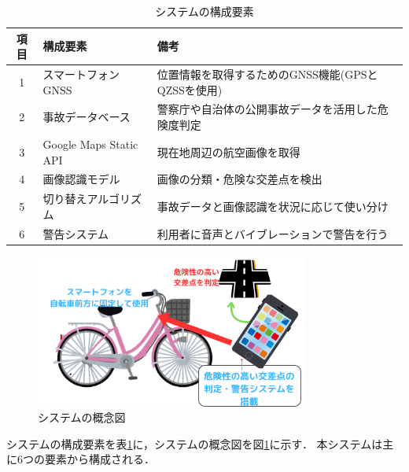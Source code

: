 \documentclass[uplatex,dvipdfmx]{jsarticle}
\begin{document}
\begin{table}[H]
  \centering
  \caption{システムの構成要素}
  \label{tab:system_components}
  \begin{tabular}{|c|l|l|}
    \hline
    項目 & 構成要素 & 備考\\ \hline
    1 & スマートフォンGNSS & 位置情報を取得するためのGNSS機能(GPSとQZSSを使用) \\ \hline
    2 & 事故データベース & 警察庁や自治体の公開事故データを活用した危険度判定 \\ \hline
    3 & Google Maps Static API & 現在地周辺の航空画像を取得 \\ \hline
    4 & 画像認識モデル & 画像の分類・危険な交差点を検出 \\ \hline
    5 & 切り替えアルゴリズム & 事故データと画像認識を状況に応じて使い分け \\ \hline
  6 & 警告システム & 利用者に音声とバイブレーションで警告を行う \\ \hline
  \end{tabular}
\end{table}

\begin{figure}[H]
  \centering
  \includegraphics[width=0.8\textwidth]{./Figs/gainenzu_final.png}
  \caption{システムの概念図}
  \label{fig:system_final}
\end{figure}

システムの構成要素を表\ref{tab:system_components}に，システムの概念図を図\ref{fig:system_final}に示す．
本システムは主に6つの要素から構成される．
\end{document}
